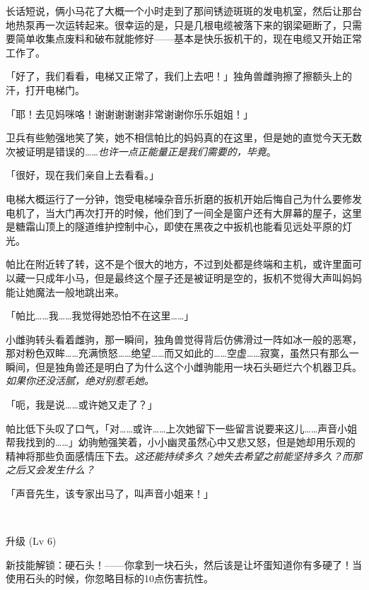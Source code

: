 \horizonline


长话短说，俩小马花了大概一个小时走到了那间锈迹斑斑的发电机室，然后让那台地热泵再一次运转起来。很幸运的是，只是几根电缆被落下来的钢梁砸断了，只需要简单收集点废料和破布就能修好——基本是快乐扳机干的，现在电缆又开始正常工作了。

「好了，我们看看，电梯又正常了，我们上去吧！」独角兽雌驹擦了擦额头上的汗，打开电梯门。

「耶！去见妈咪咯！谢谢谢谢谢非常谢谢你乐乐姐姐！」

卫兵有些勉强地笑了笑，她不相信帕比的妈妈真的在这里，但是她的直觉今天无数次被证明是错误的……\emph{也许一点正能量正是我们需要的，毕竟}。


「很好，现在我们亲自上去看看。」

电梯大概运行了一分钟，饱受电梯噪杂音乐折磨的扳机开始后悔自己为什么要修发电机了，当大门再次打开的时候，他们到了一间全是窗户还有大屏幕的屋子，这里是糖霜山顶上的隧道维护控制中心，即使在黑夜之中扳机也能看见远处平原的灯光。

帕比在附近转了转，这不是个很大的地方，不过到处都是终端和主机，或许里面可以藏一只成年小马，但是最终这个屋子还是被证明是空的，扳机不觉得大声叫妈妈能让她魔法一般地跳出来。

「帕比……我……我觉得她恐怕不在这里……」

小雌驹转头看着雌驹，那一瞬间，独角兽觉得背后仿佛滑过一阵如冰一般的恶寒，那对粉色双眸……充满愤怒……绝望……而又如此的……空虚……寂寞，虽然只有那么一瞬间，但是独角兽还是明白了为什么这个小雌驹能用一块石头砸烂六个机器卫兵。\emph{如果你还没活腻，绝对别惹毛她。}

「呃，我是说……或许她又走了？」

帕比低下头叹了口气，「对……或许……上次她留下一些留言说要来这儿……声音小姐帮我找到的……」幼驹勉强笑着，小小幽灵虽然心中又悲又怒，但是她却用乐观的精神将那些负面感情压下去。\emph{这还能持续多久？她失去希望之前能坚持多久？而那之后又会发生什么？}

「声音先生，该专家出马了，叫声音小姐来！」

~\vfill

\begin{note}
    升级 (Lv 6)

    新技能解锁：硬石头！——你拿到一块石头，然后该是让坏蛋知道你有多硬了！当使用石头的时候，你忽略目标的10点伤害抗性。
\end{note}




